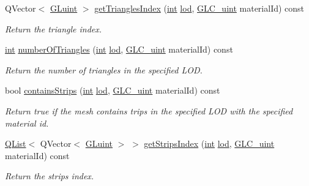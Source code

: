 \begin{DoxyCompactItemize}
Q\-Vector$<$ \hyperlink{glext_8h_a2f0c8cd5c21f9fcbd931c3f48bc90dfc}{G\-Luint} $>$ \hyperlink{class_g_l_c___mesh_aa1764f724dbc7126a40a46a705204229}{get\-Triangles\-Index} (\hyperlink{ioapi_8h_a787fa3cf048117ba7123753c1e74fcd6}{int} \hyperlink{glext_8h_a5b5a34b88a28ab9c203c2b432f6168b6}{lod}, \hyperlink{glc__global_8h_abf950976fabed69026558df8e2da6c6b}{G\-L\-C\-\_\-uint} material\-Id) const 
\begin{DoxyCompactList}\small\item\em Return the triangle index. \end{DoxyCompactList}\item 
\hyperlink{ioapi_8h_a787fa3cf048117ba7123753c1e74fcd6}{int} \hyperlink{class_g_l_c___mesh_acb3ee84f1f3a56c256889965776c9c06}{number\-Of\-Triangles} (\hyperlink{ioapi_8h_a787fa3cf048117ba7123753c1e74fcd6}{int} \hyperlink{glext_8h_a5b5a34b88a28ab9c203c2b432f6168b6}{lod}, \hyperlink{glc__global_8h_abf950976fabed69026558df8e2da6c6b}{G\-L\-C\-\_\-uint} material\-Id) const 
\begin{DoxyCompactList}\small\item\em Return the number of triangles in the specified L\-O\-D. \end{DoxyCompactList}\item 
bool \hyperlink{class_g_l_c___mesh_a5fb1d8acb3ec3be894a979d5b7cf55ba}{contains\-Strips} (\hyperlink{ioapi_8h_a787fa3cf048117ba7123753c1e74fcd6}{int} \hyperlink{glext_8h_a5b5a34b88a28ab9c203c2b432f6168b6}{lod}, \hyperlink{glc__global_8h_abf950976fabed69026558df8e2da6c6b}{G\-L\-C\-\_\-uint} material\-Id) const 
\begin{DoxyCompactList}\small\item\em Return true if the mesh contains trips in the specified L\-O\-D with the specified material id. \end{DoxyCompactList}\item 
\hyperlink{class_q_list}{Q\-List}$<$ Q\-Vector$<$ \hyperlink{glext_8h_a2f0c8cd5c21f9fcbd931c3f48bc90dfc}{G\-Luint} $>$ $>$ \hyperlink{class_g_l_c___mesh_a6f7a02053a43e9f4f92c0f08121ac32a}{get\-Strips\-Index} (\hyperlink{ioapi_8h_a787fa3cf048117ba7123753c1e74fcd6}{int} \hyperlink{glext_8h_a5b5a34b88a28ab9c203c2b432f6168b6}{lod}, \hyperlink{glc__global_8h_abf950976fabed69026558df8e2da6c6b}{G\-L\-C\-\_\-uint} material\-Id) const 
\begin{DoxyCompactList}\small\item\em Return the strips index. \end{DoxyCompactList}\item 

\end{DoxyCompactItemize}
